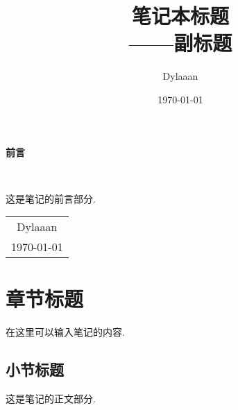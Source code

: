\documentclass[12pt, a4paper, oneside]{ctexbook}
\title{{\Huge{\textbf{笔记本标题}}}\\——副标题}
\author{Dylaaan}
\date{\today}
\begin{document}
	
	\maketitle
	
	\setcounter{page}{1}
	
	\begin{center}
		\Huge\textbf{前言}
	\end{center}~\
	
	这是笔记的前言部分. 
	~\\
	\begin{flushright}
		\begin{tabular}{c}
			Dylaaan\\
			\today
		\end{tabular}
	\end{flushright}
	
	\newpage
	\setcounter{page}{1}
	\tableofcontents
	\newpage
	\setcounter{page}{1}
	
	\chapter{章节标题}
	
	在这里可以输入笔记的内容. 
	
	\section{小节标题}
	
	这是笔记的正文部分. 
	
\end{document}
